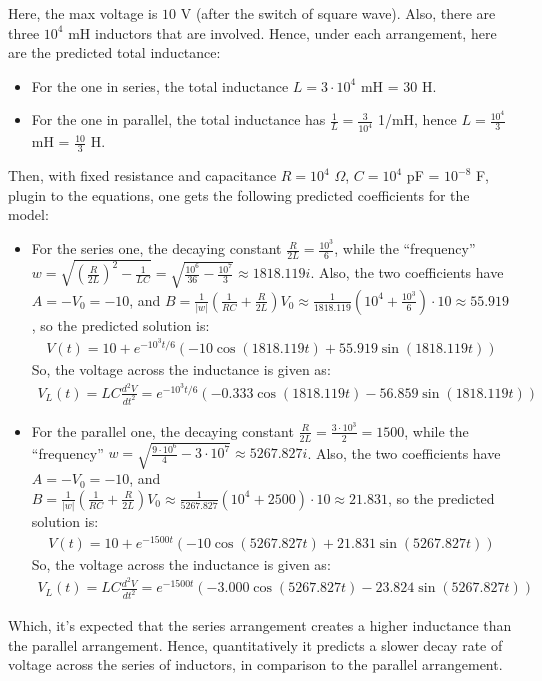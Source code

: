 \documentclass{article}
\begin{document}
Here, the max voltage is $10$ V (after the switch of square wave). Also, there are three $10^4$ mH inductors that are involved. Hence, under each arrangement, here are the predicted total inductance:
\begin{itemize}
    \item For the one in series, the total inductance $L = 3\cdot 10^4$ mH = $30$ H.
    \item For the one in parallel, the total inductance has $\frac{1}{L}=\frac{3}{10^4}$ 1/mH, hence $L = \frac{10^4}{3}$ mH = $\frac{10}{3}$ H.
\end{itemize}
Then, with fixed resistance and capacitance $R=10^4$ $\Omega$, $C=10^4$ pF = $10^{-8}$ F, plugin to the equations, one gets the following predicted coefficients for the model: 
\begin{itemize}
    \item For the series one, the decaying constant $\frac{R}{2L} = \frac{10^3}{6}$, while the ``frequency'' $w = \sqrt{\left(\frac{R}{2L}\right)^2-\frac{1}{LC}} = \sqrt{\frac{10^6}{36}-\frac{10^7}{3}}\approx 1818.119 i$. Also, the two coefficients have $A = -V_0 = -10$, and $B = \frac{1}{|w|}\left(\frac{1}{RC}+\frac{R}{2L}\right)V_0\approx \frac{1}{1818.119}\left(10^4+\frac{10^3}{6}\right)\cdot 10 \approx 55.919$, so the predicted solution is:
    \begin{align}
        V(t)=10+e^{-10^3t/6}\left(-10\cos(1818.119t)+55.919\sin(1818.119t)\right)
    \end{align}
    So, the voltage across the inductance is given as:
    \begin{align}
        V_L(t) = LC\frac{d^2V}{dt^2} = e^{-10^3t/6}\left(-0.333\cos(1818.119t)-56.859\sin(1818.119t)\right)
    \end{align}
    \item For the parallel one, the decaying constant $\frac{R}{2L}=\frac{3\cdot 10^3}{2}=1500$, while the ``frequency'' $w = \sqrt{\frac{9\cdot 10^6}{4}-3\cdot 10^7} \approx 5267.827 i$. Also, the two coefficients have $A=-V_0=-10$, and $B=\frac{1}{|w|}\left(\frac{1}{RC}+\frac{R}{2L}\right)V_0 \approx \frac{1}{5267.827}\left(10^4+2500\right)\cdot 10 \approx 21.831$, so the predicted solution is:
    \begin{align}
        V(t) = 10+e^{-1500t}\left(-10\cos(5267.827t)+21.831\sin(5267.827t)\right)
    \end{align}
    So, the voltage across the inductance is given as:
    \begin{align}
        V_L(t) = LC\frac{d^2V}{dt^2}= e^{-1500t}\left(-3.000\cos(5267.827t)-23.824\sin(5267.827t)\right)
    \end{align}
\end{itemize}
Which, it's expected that the series arrangement creates a higher inductance than the parallel arrangement. Hence, quantitatively it predicts a slower decay rate of voltage across the series of inductors, in comparison to the parallel arrangement.
\end{document}
